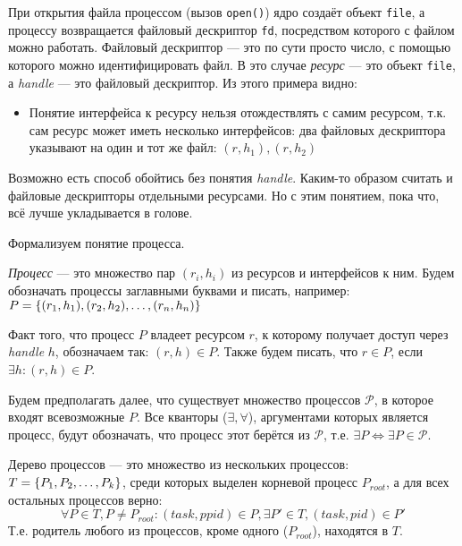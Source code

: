 \begin{exmp}
При открытия файла процессом (вызов \texttt{open()}) ядро создаёт объект \texttt{file}, а процессу возвращается файловый дескриптор \texttt{fd}, посредством которого с файлом можно работать. Файловый дескриптор --- это по сути просто число, с помощью которого можно идентифицировать файл. В это случае \emph{ресурс} --- это объект \texttt{file}, а \emph{handle} --- это файловый дескриптор. Из этого примера видно:
\begin{itemize}
	\item Понятие интерфейса к ресурсу нельзя отождествлять с самим ресурсом, т.к. сам ресурс может иметь несколько интерфейсов: два файловых дескриптора указывают на один и тот же файл: $(r, h_1), (r, h_2)$
\end{itemize}
\end{exmp}

\begin{note}
Возможно есть способ обойтись без понятия \emph{handle}. Каким-то образом считать и файловые дескрипторы отдельными ресурсами. Но с этим понятием, пока что, всё лучше укладывается в голове.
\end{note}

Формализуем понятие процесса.

\begin{defn}
\emph{Процесс} --- это множество пар $(r_i, h_i)$ из ресурсов и интерфейсов к ним. Будем обозначать процессы заглавными буквами и писать, например: $P = \left\lbrace (r_1, h_1), (r_2, h_2), \ldots, (r_n, h_n) \right\rbrace$
\end{defn}

Факт того, что процесс $P$ владеет ресурсом $r$, к которому получает доступ через \textit{handle} $h$, обозначаем так: $(r, h) \in P$. Также будем писать, что $r \in P$, если $\exists h: (r, h) \in P$.

Будем предполагать далее, что существует множество процессов $\mathcal{P}$, в которое входят всевозможные $P$. Все кванторы ($\exists, \forall$), аргументами которых является процесс, будут обозначать, что процесс этот берётся из $\mathcal{P}$, т.е. $\exists P \Longleftrightarrow \exists P \in \mathcal{P}$.

\begin{defn}
Дерево процессов --- это множество из нескольких процессов: $T = \left\lbrace P_1, P_2, \ldots, P_k \right\rbrace$, среди которых выделен корневой процесс $P_{root}$, а для всех остальных процессов верно:
\begin{equation*}
\forall P \in T, P \neq P_{root}: (task, ppid) \in P, \exists P' \in T, (task, pid) \in P'
\end{equation*}
Т.е. родитель любого из процессов, кроме одного ($P_{root}$), находятся в $T$.
\end{defn}

